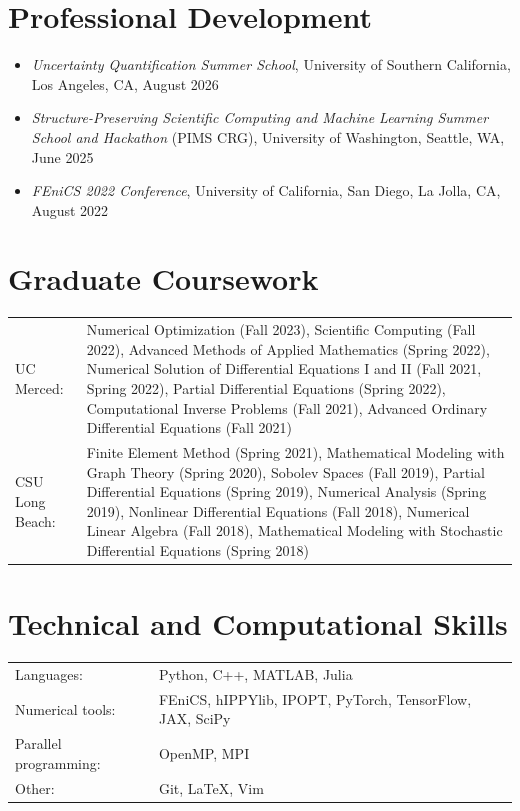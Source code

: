 \documentclass[11pt]{article}
\begin{document}
\section*{Professional Development}

\begin{itemize}
\item {\it Uncertainty Quantification Summer School}, University of
  Southern California, Los Angeles, CA, August 2026
\item {\it Structure-Preserving Scientific Computing and Machine
  Learning Summer School and Hackathon} (PIMS CRG), University of
  Washington, Seattle, WA, June 2025
\item {\it FEniCS 2022 Conference}, University of California, San
  Diego, La Jolla, CA, August 2022
\end{itemize}

\section*{Graduate Coursework}

\noindent
\begin{tabular}{lp{}}
UC Merced: & Numerical Optimization (Fall 2023), Scientific Computing
(Fall 2022), Advanced Methods of Applied Mathematics (Spring 2022),
Numerical Solution of Differential Equations I and II (Fall 2021,
Spring 2022), Partial Differential Equations (Spring 2022),
Computational Inverse Problems (Fall 2021), Advanced Ordinary
Differential Equations (Fall 2021) \\
CSU Long Beach: & Finite Element Method (Spring 2021), Mathematical
Modeling with Graph Theory (Spring 2020), Sobolev Spaces (Fall 2019),
Partial Differential Equations (Spring 2019), Numerical Analysis
(Spring 2019), Nonlinear Differential Equations (Fall 2018), Numerical
Linear Algebra (Fall 2018), Mathematical Modeling with Stochastic
Differential Equations (Spring 2018)
\end{tabular}

\section*{Technical and Computational Skills}

\noindent
\begin{tabular}{lp{}}
Languages: & Python, C++, MATLAB, Julia \\
Numerical tools: & FEniCS, hIPPYlib, IPOPT, PyTorch, TensorFlow, JAX,
SciPy \\
Parallel programming: & OpenMP, MPI \\
Other: & Git, \LaTeX, Vim
\end{tabular}
\end{document}
